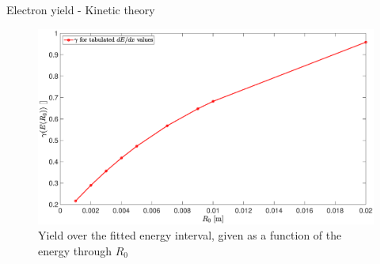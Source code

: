 \documentclass[aspectratio=169,xcolor=dvipsnames,8pt]{beamer}
\begin{document}

\begin{frame}{Electron yield - Kinetic theory}
		\begin{figure}[h!]
		\includegraphics[width=1 \textwidth]{YieldFit3AllPts.eps}
		\caption{\label{config}Yield over the fitted energy interval, given as a function of the energy through $R_0$}
		\end{figure}
\end{frame}






\end{document}

